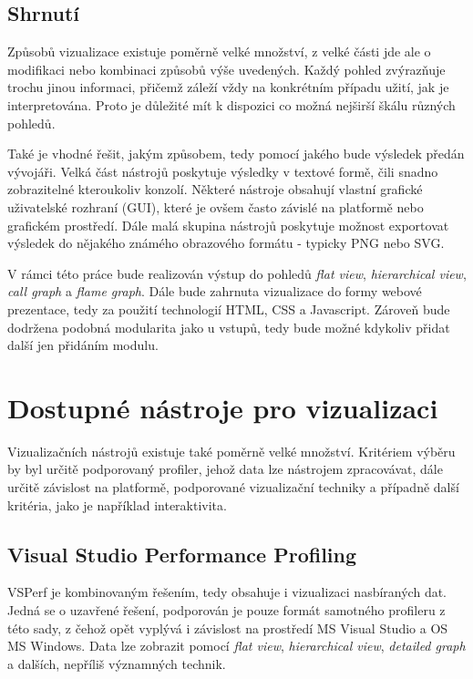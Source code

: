 \documentclass[czech,BP]{thesiskiv}
\begin{document}
\section{Shrnutí}

Způsobů vizualizace existuje poměrně velké množství, z velké části jde ale o modifikaci nebo kombinaci způsobů výše uvedených. Každý pohled zvýrazňuje trochu jinou informaci, přičemž záleží vždy na konkrétním případu užití, jak je interpretována. Proto je důležité mít k dispozici co možná nejširší škálu různých pohledů.

Také je vhodné řešit, jakým způsobem, tedy pomocí jakého  bude výsledek předán vývojáři. Velká část nástrojů poskytuje výsledky v textové formě, čili snadno zobrazitelné kteroukoliv konzolí. Některé nástroje obsahují vlastní grafické uživatelské rozhraní (GUI), které je ovšem často závislé na platformě nebo grafickém prostředí. Dále malá skupina nástrojů poskytuje možnost exportovat výsledek do nějakého známého obrazového formátu - typicky PNG nebo SVG.

V rámci této práce bude realizován výstup do pohledů \emph{flat view}, \emph{hierarchical view}, \emph{call graph} a \emph{flame graph}. Dále bude zahrnuta vizualizace do formy webové prezentace, tedy za použití technologií HTML, CSS a Javascript. Zároveň bude dodržena podobná modularita jako u vstupů, tedy bude možné kdykoliv přidat další  jen přidáním modulu.


\newpage

\chapter{Dostupné nástroje pro vizualizaci}

Vizualizačních nástrojů existuje také poměrně velké množství. Kritériem výběru by byl určitě podporovaný profiler, jehož data lze nástrojem zpracovávat, dále určitě závislost na platformě, podporované vizualizační techniky a případně další kritéria, jako je například interaktivita.

\section{Visual Studio Performance Profiling}

VSPerf je kombinovaným řešením, tedy obsahuje i vizualizaci nasbíraných dat. Jedná se o uzavřené řešení, podporován je pouze formát samotného profileru z této sady, z čehož opět vyplývá i závislost na prostředí MS Visual Studio a OS MS Windows. Data lze zobrazit pomocí \emph{flat view}, \emph{hierarchical view}, \emph{detailed graph} a dalších, nepříliš významných technik.
\end{document}
